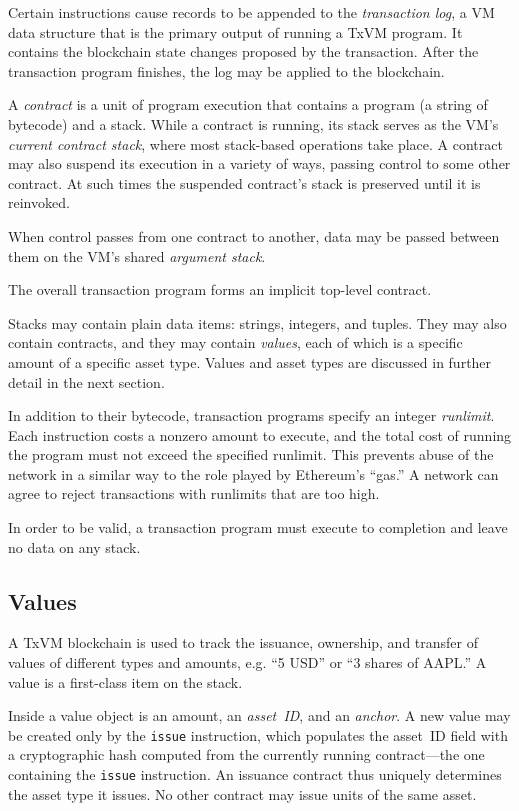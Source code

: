 \documentclass{article}
\newcommand{\txvm}{TxVM}
\begin{document}
Certain instructions cause records to be appended to the
\textit{transaction log}, a VM data structure that is the primary
output of running a \txvm{} program. It contains the blockchain state
changes proposed by the transaction. After the transaction program
finishes, the log may be applied to the blockchain.

A \textit{contract} is a unit of program execution that contains a
program (a string of bytecode) and a stack. While a contract is
running, its stack serves as the VM's \textit{current contract stack},
where most stack-based operations take place. A contract may also
suspend its execution in a variety of ways, passing control to some
other contract. At such times the suspended contract's stack is
preserved until it is reinvoked.

When control passes from one contract to another, data may be passed
between them on the VM's shared \textit{argument stack}.

The overall transaction program forms an implicit top-level contract.

Stacks may contain plain data items: strings, integers, and
tuples. They may also contain contracts, and they may contain
\textit{values}, each of which is a specific amount of a specific
asset type. Values and asset types are discussed in further detail in
the next section.

In addition to their bytecode, transaction programs specify an integer
\textit{runlimit}. Each instruction costs a nonzero amount to execute,
and the total cost of running the program must not exceed the
specified runlimit. This prevents abuse of the network in a similar
way to the role played by Ethereum's ``gas.'' A network can agree to
reject transactions with runlimits that are too high.

In order to be valid, a transaction program must execute to completion
and leave no data on any stack.

\subsection{Values}

A \txvm{} blockchain is used to track the issuance, ownership, and
transfer of values of different types and amounts, e.g. ``5 USD'' or
``3 shares of AAPL.'' A value is a first-class item on the stack.

Inside a value object is an amount, an \textit{asset~ID}, and an
\textit{anchor}. A new value may be created only by the \texttt{issue}
instruction, which populates the asset~ID field with a cryptographic
hash computed from the currently running contract---the one containing
the \texttt{issue} instruction. An issuance contract thus uniquely
determines the asset type it issues. No other contract may issue units
of the same asset.
\end{document}
